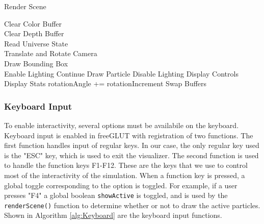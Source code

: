 \documentclass[fleqn,10pt]{UserGuideArx} %
\begin{document}
    \begin{algorithm}
        \caption{Render Scene}\label{fig:RenderFunction}
        Clear Color Buffer\\
        Clear Depth Buffer\\
        Read Universe State\\
        Translate and Rotate Camera\\
        Draw Bounding Box\\
        {
            Enable Lighting
        }
        {
            {
                Continue
            }
            \Else
            {
                Draw Particle
            }
        }
        {
            Disable Lighting
        }
        Display Controls
        Display Stats
        {
            rotationAngle += rotationIncrement 
        }
        Swap Buffers
    \end{algorithm}
    
\subsubsection{Keyboard Input}
    To enable interactivity, several options must be availabile on the keyboard. Keyboard input is enabled in freeGLUT with registration of two functions. The first function handles input of regular keys. In our case, the only regular key used is the "ESC" key, which is used to exit the visualizer. The second function is used to handle the function keys F1-F12. These are the keys that we use to control most of the interactivity of the simulation. When a function key is pressed, a global toggle corresponding to the option is toggled. For example, if a user presses "F4" a global boolean \texttt{showActive} is toggled, and is used by the \texttt{renderScene()} function to determine whether or not to draw the active particles. Shown in Algorithm \ref{alg:Keyboard} are the keyboard input functions.\\
\end{document}
